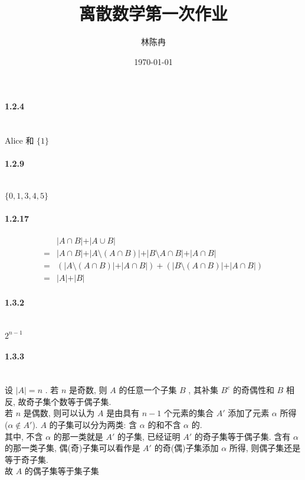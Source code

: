\documentclass[a4paper, UTF8]{ctexart}				%
\title{离散数学第一次作业}
\author{林陈冉}
\date{\today}
\numberwithin{equation}{section}				%
\begin{document}
    \maketitle										%
    \paragraph{1.2.4}\quad \\
        Alice 和 $\{1\}$
    \paragraph{1.2.9}\quad\\
        $\{0, 1, 3, 4, 5\}$
    \paragraph{1.2.17}\quad
        \begin{equation*}
            \begin{split}
                &\vert{A \cap B}\vert + \vert{A \cup B}\vert\\
                = &\vert{A \cap B}\vert + \vert{A \setminus (A \cap B)}\vert + \vert{B \setminus A \cap B}\vert + \vert{A \cap B}\vert\\
                = & (\vert{A \setminus (A \cap B)}\vert + \vert{A \cap B}\vert) + (\vert{B \setminus (A \cap B)}\vert + \vert{A \cap B}\vert)\\
                = & \vert{A}\vert + \vert{B}\vert
            \end{split}
        \end{equation*}
    \paragraph{1.3.2}\quad\\
        $2^{n-1}$
    \paragraph{1.3.3}\quad\\
        设 $\vert{A}\vert = n$ . 若 $n$ 是奇数, 则 $A$ 的任意一个子集 $B$ , 其补集 $B^c$ 的奇偶性和 $B$ 相反, 故奇子集个数等于偶子集.\\
        若 $n$ 是偶数, 则可以认为 $A$ 是由具有 $n - 1$ 个元素的集合 $A'$ 添加了元素 $\alpha$ 所得 ($\alpha \notin A'$). $A$ 的子集可以分为两类: 含 $\alpha$ 的和不含 $\alpha$ 的.\\
        其中, 不含 $\alpha$ 的那一类就是 $A'$ 的子集, 已经证明 $A'$ 的奇子集等于偶子集. 含有 $\alpha$ 的那一类子集, 偶(奇)子集可以看作是 $A'$ 的奇(偶)子集添加 $\alpha$ 所得, 则偶子集还是等于奇子集.\\
        故 $A$ 的偶子集等于集子集
\end{document}
